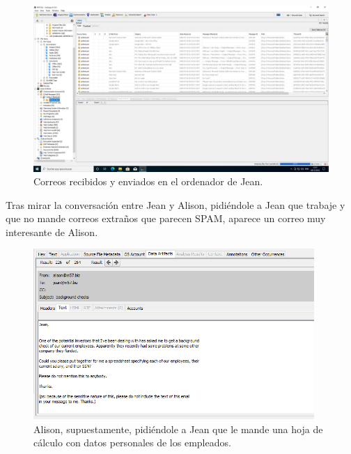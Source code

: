 \documentclass{article}
\begin{document}
\begin{figure}[H]
    \centering
    \includegraphics[width=\textwidth]{imagenes/Windows/Captura de pantalla (8).png}
    \caption{Correos recibidos y enviados en el ordenador de Jean.}
\end{figure}

Tras mirar la conversación entre Jean y Alison, pidiéndole a Jean que trabaje y que no mande correos extraños que parecen SPAM, aparece un correo muy interesante de Alison.

\begin{figure}[H]
    \centering
    \includegraphics[width=0.95\textwidth]{imagenes/Windows/Captura de pantalla (9).png}
    \caption{Alison, supuestamente, pidiéndole a Jean que le mande una hoja de cálculo con datos personales de los empleados.}
\end{figure}
\end{document}
